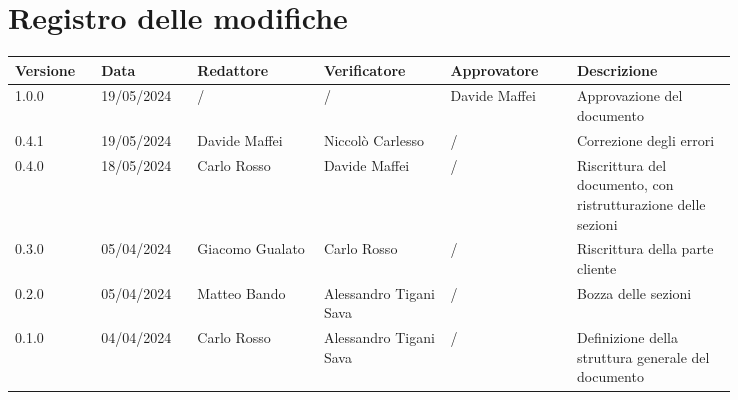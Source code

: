 \section*{Registro delle modifiche}
 {
  \scriptsize
  \begin{tabular}{p{0.10\linewidth}p{0.10\linewidth}p{0.15\linewidth}p{0.15\linewidth}p{0.15\linewidth}p{0.19\linewidth}}
	  \textbf{Versione} & \textbf{Data} & \textbf{Redattore}     & \textbf{Verificatore} & \textbf{Approvatore} & \textbf{Descrizione} \\
	  \toprule
	  1.0.0				& 19/05/2024	&			/			&			/			& Davide Maffei			& Approvazione del documento \\
	  \hline 
	  0.4.1 			& 19/05/2024	& Davide Maffei		& Niccolò Carlesso             &         /               & Correzione degli errori                                                        \\
	  \hline
	  0.4.0             & 18/05/2024    & Carlo Rosso	&	Davide Maffei					&		/			& Riscrittura del documento, con ristrutturazione delle sezioni \\
	  \hline
	  0.3.0             & 05/04/2024    & Giacomo Gualato & Carlo Rosso						&		/			& Riscrittura della parte cliente \\
	  \hline
	  0.2.0             & 05/04/2024    & Matteo Bando & Alessandro Tigani Sava				&        /       	& Bozza delle sezioni \\ 
	  \hline
	  0.1.0             & 04/04/2024    & Carlo Rosso & Alessandro Tigani Sava              &        /       	& Definizione della struttura generale del documento \\
	\hline
	\end{tabular}
 }
